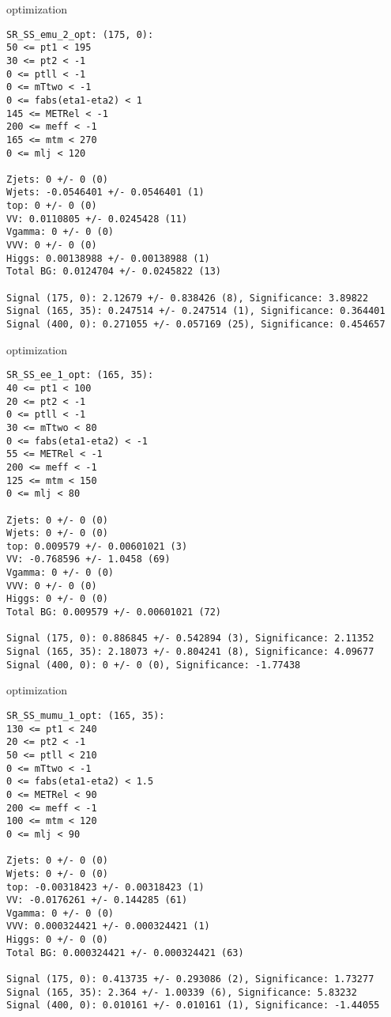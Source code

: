 \begin{frame}[fragile]{optimization}
\tiny
\begin{verbatim}
SR_SS_emu_2_opt: (175, 0):
50 <= pt1 < 195
30 <= pt2 < -1
0 <= ptll < -1
0 <= mTtwo < -1
0 <= fabs(eta1-eta2) < 1
145 <= METRel < -1
200 <= meff < -1
165 <= mtm < 270
0 <= mlj < 120

Zjets: 0 +/- 0 (0)
Wjets: -0.0546401 +/- 0.0546401 (1)
top: 0 +/- 0 (0)
VV: 0.0110805 +/- 0.0245428 (11)
Vgamma: 0 +/- 0 (0)
VVV: 0 +/- 0 (0)
Higgs: 0.00138988 +/- 0.00138988 (1)
Total BG: 0.0124704 +/- 0.0245822 (13)

Signal (175, 0): 2.12679 +/- 0.838426 (8), Significance: 3.89822
Signal (165, 35): 0.247514 +/- 0.247514 (1), Significance: 0.364401
Signal (400, 0): 0.271055 +/- 0.057169 (25), Significance: 0.454657
\end{verbatim}
\end{frame}

\begin{frame}[fragile]{optimization}
\tiny
\begin{verbatim}
SR_SS_ee_1_opt: (165, 35):
40 <= pt1 < 100
20 <= pt2 < -1
0 <= ptll < -1
30 <= mTtwo < 80
0 <= fabs(eta1-eta2) < -1
55 <= METRel < -1
200 <= meff < -1
125 <= mtm < 150
0 <= mlj < 80

Zjets: 0 +/- 0 (0)
Wjets: 0 +/- 0 (0)
top: 0.009579 +/- 0.00601021 (3)
VV: -0.768596 +/- 1.0458 (69)
Vgamma: 0 +/- 0 (0)
VVV: 0 +/- 0 (0)
Higgs: 0 +/- 0 (0)
Total BG: 0.009579 +/- 0.00601021 (72)

Signal (175, 0): 0.886845 +/- 0.542894 (3), Significance: 2.11352
Signal (165, 35): 2.18073 +/- 0.804241 (8), Significance: 4.09677
Signal (400, 0): 0 +/- 0 (0), Significance: -1.77438
\end{verbatim}
\end{frame}

\begin{frame}[fragile]{optimization}
\tiny
\begin{verbatim}
SR_SS_mumu_1_opt: (165, 35):
130 <= pt1 < 240
20 <= pt2 < -1
50 <= ptll < 210
0 <= mTtwo < -1
0 <= fabs(eta1-eta2) < 1.5
0 <= METRel < 90
200 <= meff < -1
100 <= mtm < 120
0 <= mlj < 90

Zjets: 0 +/- 0 (0)
Wjets: 0 +/- 0 (0)
top: -0.00318423 +/- 0.00318423 (1)
VV: -0.0176261 +/- 0.144285 (61)
Vgamma: 0 +/- 0 (0)
VVV: 0.000324421 +/- 0.000324421 (1)
Higgs: 0 +/- 0 (0)
Total BG: 0.000324421 +/- 0.000324421 (63)

Signal (175, 0): 0.413735 +/- 0.293086 (2), Significance: 1.73277
Signal (165, 35): 2.364 +/- 1.00339 (6), Significance: 5.83232
Signal (400, 0): 0.010161 +/- 0.010161 (1), Significance: -1.44055
\end{verbatim}
\end{frame}

